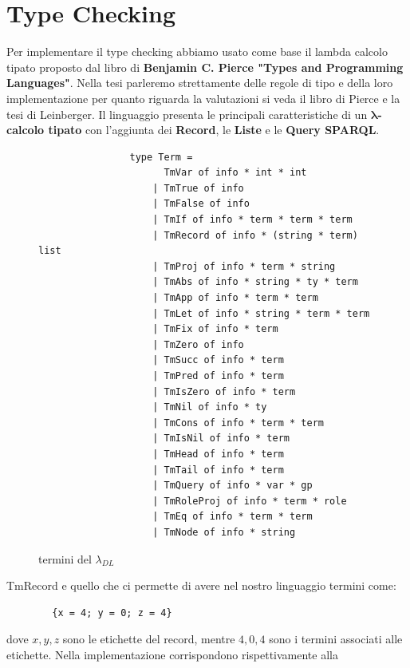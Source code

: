 \section{Type Checking}
        Per implementare il type checking abbiamo usato come base il lambda calcolo tipato proposto dal libro di \textbf{Benjamin C. Pierce "Types and Programming Languages"}.
        Nella tesi parleremo strettamente delle regole di tipo e della loro implementazione per quanto riguarda la valutazioni si veda il libro di Pierce e la tesi di Leinberger.
        Il linguaggio presenta le principali caratteristiche di un \textbf{ $\boldsymbol{\lambda}$-calcolo tipato} con l'aggiunta dei \textbf{Record}, le \textbf{Liste} e le \textbf{Query SPARQL}.
        \begin{figure}[h] 
            \begin{verbatim}
                type Term =
                      TmVar of info * int * int 
                    | TmTrue of info 
                    | TmFalse of info 
                    | TmIf of info * term * term * term 
                    | TmRecord of info * (string * term) list 
                    | TmProj of info * term * string 
                    | TmAbs of info * string * ty * term 
                    | TmApp of info * term * term 
                    | TmLet of info * string * term * term 
                    | TmFix of info * term 
                    | TmZero of info 
                    | TmSucc of info * term 
                    | TmPred of info * term 
                    | TmIsZero of info * term 
                    | TmNil of info * ty 
                    | TmCons of info * term * term 
                    | TmIsNil of info * term 
                    | TmHead of info * term 
                    | TmTail of info * term  
                    | TmQuery of info * var * gp
                    | TmRoleProj of info * term * role
                    | TmEq of info * term * term
                    | TmNode of info * string
            \end{verbatim}
        \caption{termini del $\lambda_{DL}$}
        \end{figure}
        TmRecord e quello che ci permette di avere nel nostro linguaggio termini come:
        \begin{verbatim}
        {x = 4; y = 0; z = 4}
        \end{verbatim}
        dove $x, y, z$ sono le etichette del record, mentre $4, 0, 4$ sono i termini associati alle etichette. Nella implementazione corrispondono rispettivamente alla
